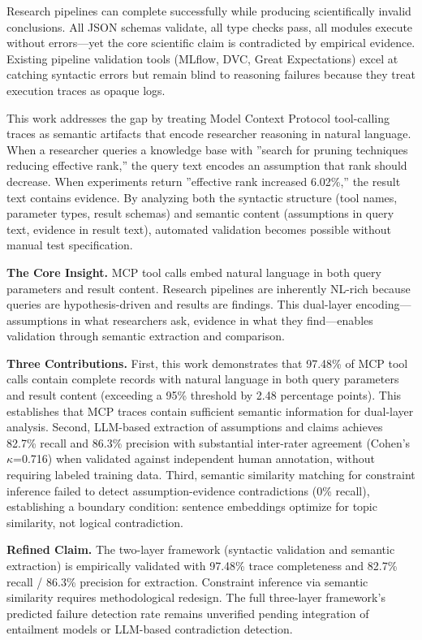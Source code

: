 
Research pipelines can complete successfully while producing scientifically invalid conclusions. All JSON schemas validate, all type checks pass, all modules execute without errors---yet the core scientific claim is contradicted by empirical evidence. Existing pipeline validation tools (MLflow, DVC, Great Expectations) excel at catching syntactic errors but remain blind to reasoning failures because they treat execution traces as opaque logs.

This work addresses the gap by treating Model Context Protocol tool-calling traces as semantic artifacts that encode researcher reasoning in natural language. When a researcher queries a knowledge base with ''search for pruning techniques reducing effective rank,'' the query text encodes an assumption that rank should decrease. When experiments return ''effective rank increased 6.02\%,'' the result text contains evidence. By analyzing both the syntactic structure (tool names, parameter types, result schemas) and semantic content (assumptions in query text, evidence in result text), automated validation becomes possible without manual test specification.

\textbf{The Core Insight.} MCP tool calls embed natural language in both query parameters and result content. Research pipelines are inherently NL-rich because queries are hypothesis-driven and results are findings. This dual-layer encoding---assumptions in what researchers ask, evidence in what they find---enables validation through semantic extraction and comparison.

\textbf{Three Contributions.} First, this work demonstrates that 97.48\% of MCP tool calls contain complete records with natural language in both query parameters and result content (exceeding a 95\% threshold by 2.48 percentage points). This establishes that MCP traces contain sufficient semantic information for dual-layer analysis. Second, LLM-based extraction of assumptions and claims achieves 82.7\% recall and 86.3\% precision with substantial inter-rater agreement (Cohen's $\kappa$=0.716) when validated against independent human annotation, without requiring labeled training data. Third, semantic similarity matching for constraint inference failed to detect assumption-evidence contradictions (0\% recall), establishing a boundary condition: sentence embeddings optimize for topic similarity, not logical contradiction.

\textbf{Refined Claim.} The two-layer framework (syntactic validation and semantic extraction) is empirically validated with 97.48\% trace completeness and 82.7\% recall / 86.3\% precision for extraction. Constraint inference via semantic similarity requires methodological redesign. The full three-layer framework's predicted failure detection rate remains unverified pending integration of entailment models or LLM-based contradiction detection.


